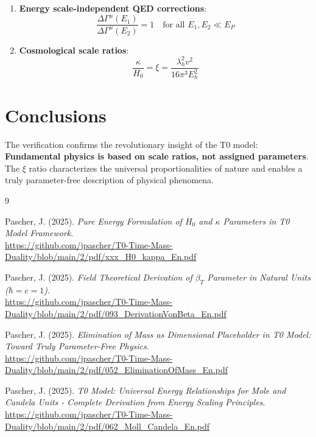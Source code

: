 \documentclass[12pt,a4paper]{article}
\begin{document}
\begin{enumerate}
	\item \textbf{Energy scale-independent QED corrections}:
	\begin{equation}
		\frac{\Delta\Gamma^{\mu}(E_1)}{\Delta\Gamma^{\mu}(E_2)} = 1 \quad \text{for all } E_1, E_2 \ll E_P
	\end{equation}
	
	\item \textbf{Cosmological scale ratios}:
	\begin{equation}
		\frac{\kappa}{H_0} = \xi = \frac{\lambda_h^2 v^2}{16\pi^3 E_h^2}
	\end{equation}
\end{enumerate}

\section{Conclusions}

The verification confirms the revolutionary insight of the T0 model: \textbf{Fundamental physics is based on scale ratios, not assigned parameters}. The $\xi$ ratio characterizes the universal proportionalities of nature and enables a truly parameter-free description of physical phenomena.

\begin{thebibliography}{9}
	
	Pascher, J. (2025). \textit{Pure Energy Formulation of $H_0$ and $\kappa$ Parameters in T0 Model Framework}. \\
	\url{https://github.com/jpascher/T0-Time-Mass-Duality/blob/main/2/pdf/xxx_H0_kappa_En.pdf}
	
	Pascher, J. (2025). \textit{Field Theoretical Derivation of $\beta_T$ Parameter in Natural Units ($\hbar = c = 1$)}. \\
	\url{https://github.com/jpascher/T0-Time-Mass-Duality/blob/main/2/pdf/093_DerivationVonBeta_En.pdf}
	
	Pascher, J. (2025). \textit{Elimination of Mass as Dimensional Placeholder in T0 Model: Toward Truly Parameter-Free Physics}. \\
	\url{https://github.com/jpascher/T0-Time-Mass-Duality/blob/main/2/pdf/052_EliminationOfMass_En.pdf}
	
	Pascher, J. (2025). \textit{T0 Model: Universal Energy Relationships for Mole and Candela Units - Complete Derivation from Energy Scaling Principles}. \\
	\url{https://github.com/jpascher/T0-Time-Mass-Duality/blob/main/2/pdf/062_Moll_Candela_En.pdf}
	
\end{thebibliography}
\end{document}
